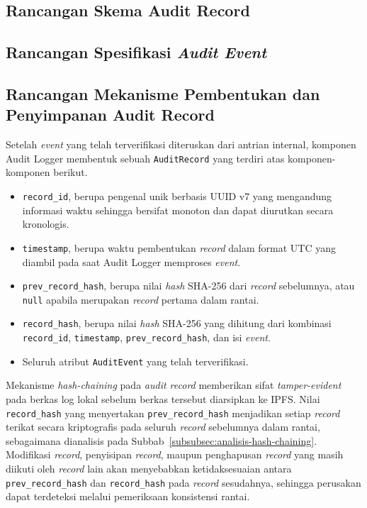 \subsection{Rancangan Skema Audit Record}
\label{subsec:rancangan-audit-record}



\subsection{Rancangan Spesifikasi \textit{Audit Event}}
\label{sec:spesifikasi-audit-event}





\subsection{Rancangan Mekanisme Pembentukan dan Penyimpanan Audit Record}
\label{subsec:rancangan-pembentukan-record}

Setelah \textit{event} yang telah terverifikasi diteruskan dari antrian internal, komponen Audit Logger membentuk sebuah \texttt{AuditRecord} yang terdiri atas komponen-komponen berikut.

\begin{itemize}
    \item \texttt{record\_id}, berupa pengenal unik berbasis UUID v7 yang mengandung informasi waktu sehingga bersifat monoton dan dapat diurutkan secara kronologis.
    \item \texttt{timestamp}, berupa waktu pembentukan \textit{record} dalam format UTC yang diambil pada saat Audit Logger memproses \textit{event}.
    \item \texttt{prev\_record\_hash}, berupa nilai \textit{hash} SHA-256 dari \textit{record} sebelumnya, atau \texttt{null} apabila merupakan \textit{record} pertama dalam rantai.
    \item \texttt{record\_hash}, berupa nilai \textit{hash} SHA-256 yang dihitung dari kombinasi \texttt{record\_id}, \texttt{timestamp}, \texttt{prev\_record\_hash}, dan isi \textit{event}.
    \item Seluruh atribut \texttt{AuditEvent} yang telah terverifikasi.
\end{itemize}

Mekanisme \textit{hash-chaining} pada \textit{audit record} memberikan sifat
\textit{tamper-evident} pada berkas log lokal sebelum berkas tersebut diarsipkan
ke IPFS. Nilai \texttt{record\_hash} yang menyertakan \texttt{prev\_record\_hash}
menjadikan setiap \textit{record} terikat secara kriptografis pada seluruh
\textit{record} sebelumnya dalam rantai, sebagaimana dianalisis pada
Subbab~\ref{subsubsec:analisis-hash-chaining}. Modifikasi \textit{record},
penyisipan \textit{record}, maupun penghapusan \textit{record} yang masih diikuti
oleh \textit{record} lain akan menyebabkan ketidaksesuaian antara
\texttt{prev\_record\_hash} dan \texttt{record\_hash} pada \textit{record}
sesudahnya, sehingga perusakan dapat terdeteksi melalui pemeriksaan konsistensi
rantai.
 
